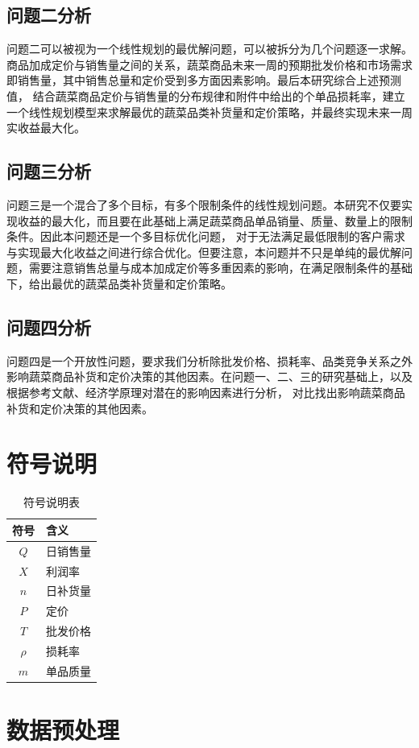 \documentclass{article}
\begin{document}
\subsection{问题二分析}
问题二可以被视为一个线性规划的最优解问题，可以被拆分为几个问题逐一求解。商品加成定价与销售量之间的关系，蔬菜商品未来一周的预期批发价格和市场需求即销售量，其中销售总量和定价受到多方面因素影响。最后本研究综合上述预测值，
结合蔬菜商品定价与销售量的分布规律和附件中给出的个单品损耗率，建立一个线性规划模型来求解最优的蔬菜品类补货量和定价策略，并最终实现未来一周实收益最大化。

\subsection{问题三分析}
问题三是一个混合了多个目标，有多个限制条件的线性规划问题。本研究不仅要实现收益的最大化，而且要在此基础上满足蔬菜商品单品销量、质量、数量上的限制条件。因此本问题还是一个多目标优化问题，
对于无法满足最低限制的客户需求与实现最大化收益之间进行综合优化。但要注意，本问题并不只是单纯的最优解问题，需要注意销售总量与成本加成定价等多重因素的影响，在满足限制条件的基础下，给出最优的蔬菜品类补货量和定价策略。
\subsection{问题四分析}
问题四是一个开放性问题，要求我们分析除批发价格、损耗率、品类竞争关系之外影响蔬菜商品补货和定价决策的其他因素。在问题一、二、三的研究基础上，以及根据参考文献、经济学原理对潜在的影响因素进行分析，
对比找出影响蔬菜商品补货和定价决策的其他因素。
\section{符号说明}
\begin{table}[H]
\centering
\caption{符号说明表}
\begin{tabular}{|c|l|}
\hline
符号 & 含义 \\
\hline
$Q$ & 日销售量 \\
$X$ & 利润率 \\
$n$ & 日补货量 \\
$P$ & 定价 \\
$T$ & 批发价格 \\ 
$\rho$ & 损耗率 \\
$m$ & 单品质量 \\
\hline
\end{tabular}
\end{table}
\section{数据预处理}
\end{document}
